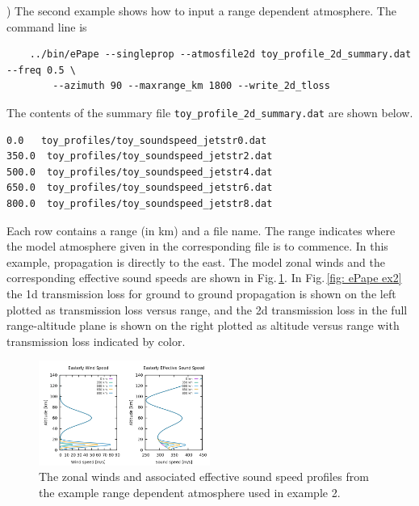 ) The second example shows how to input a range dependent atmosphere. The command line is 
\begin{verbatim}
    ../bin/ePape --singleprop --atmosfile2d toy_profile_2d_summary.dat --freq 0.5 \
    	--azimuth 90 --maxrange_km 1800 --write_2d_tloss
\end{verbatim}
The contents of the summary file \verb+toy_profile_2d_summary.dat+ are shown below. 
\begin{verbatim}
0.0   toy_profiles/toy_soundspeed_jetstr0.dat
350.0  toy_profiles/toy_soundspeed_jetstr2.dat
500.0  toy_profiles/toy_soundspeed_jetstr4.dat
650.0  toy_profiles/toy_soundspeed_jetstr6.dat
800.0  toy_profiles/toy_soundspeed_jetstr8.dat
\end{verbatim}
Each row contains a range (in km) and a file name. The range indicates where the model atmosphere given in the corresponding file is to commence. In this example, propagation is directly to the east. The model zonal winds and the corresponding effective sound speeds are shown in Fig.\,\ref{fig: ePape ex2 profiles}. In Fig.\,\ref{fig: ePape ex2} the 1d transmission loss for ground to ground propagation is shown on the left plotted as transmission loss versus range, and the 2d transmission loss in the full range-altitude plane is shown on the right plotted as altitude versus range with transmission loss indicated by color. 

\begin{figure}[h]
\begin{center}
\includegraphics[width=0.5\textwidth]{figs/ePape_ex2_profiles.png}
\end{center}
\caption{The zonal winds and associated effective sound speed profiles from the example range dependent atmosphere used in example 2.}
\label{fig: ePape ex2 profiles}
\end{figure}


